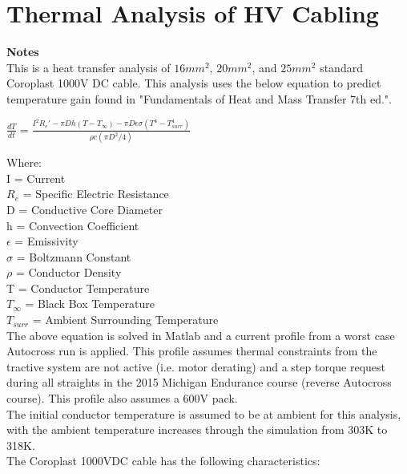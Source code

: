 \documentclass[12pt,a4paper,oneside]{memoir}
\begin{document}
\section*{Thermal Analysis of HV Cabling}
\begin{flushleft}
{\textbf{Notes\\}}
{This is a heat transfer analysis of $16 mm^2$, $20mm^2$, and $25mm^2$ standard Coroplast 1000V DC cable. This analysis uses the below equation to predict temperature gain found in "Fundamentals of Heat and Mass Transfer 7th ed.".\\}
\vspace{0.5cm}
\begin{centering}
{$ \frac{dT}{dt}=\frac{I^2R_e'-\pi Dh(T-T_\infty)-\pi D\epsilon\sigma(T^4-T_{surr}^4)}{\rho c(\pi D^2/4)}$\\}
\end{centering}
{Where:\\
I = Current\\
$R_e$ = Specific Electric Resistance\\
D = Conductive Core Diameter\\
h = Convection Coefficient\\
$\epsilon$ = Emissivity\\
$\sigma$ = Boltzmann Constant\\
$\rho$ = Conductor Density\\
T = Conductor Temperature\\
$T_{\infty}$ = Black Box Temperature\\
$T_{surr}$ = Ambient Surrounding Temperature\\
}
\vspace{0.5cm}
{The above equation is solved in Matlab and a current profile from a worst case Autocross run is applied. This profile assumes thermal constraints from the tractive system are not active (i.e. motor derating) and a step torque request during all straights in the 2015 Michigan Endurance course (reverse Autocross course). This profile also assumes a 600V pack.\\
\vspace{0.25cm}
The initial conductor temperature is assumed to be at ambient for this analysis, with the ambient temperature increases through the simulation from 303K to 318K.\\
\vspace{0.25cm}
The Coroplast 1000VDC cable has the following characteristics: }
\end{flushleft}
\end{document}
